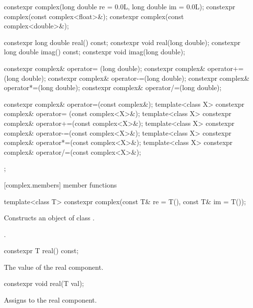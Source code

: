 \begin{codeblock}
{{    constexpr complex(long double re = 0.0L, long double im = 0.0L);
    constexpr complex(const complex<float>&);
    constexpr complex(const complex<double>&);

    constexpr long double real() const;
    constexpr void real(long double);
    constexpr long double imag() const;
    constexpr void imag(long double);

    constexpr complex& operator= (long double);
    constexpr complex& operator+=(long double);
    constexpr complex& operator-=(long double);
    constexpr complex& operator*=(long double);
    constexpr complex& operator/=(long double);

    constexpr complex& operator=(const complex&);
    template<class X> constexpr complex& operator= (const complex<X>&);
    template<class X> constexpr complex& operator+=(const complex<X>&);
    template<class X> constexpr complex& operator-=(const complex<X>&);
    template<class X> constexpr complex& operator*=(const complex<X>&);
    template<class X> constexpr complex& operator/=(const complex<X>&);
  };
}
\end{codeblock}

[complex.members]{ member functions}

%
\begin{itemdecl}
template<class T> constexpr complex(const T& re = T(), const T& im = T());
\end{itemdecl}

\begin{itemdescr}
\pnum
\effects
Constructs an object of class
.

\pnum
\postconditions
{}.
\end{itemdescr}

%
\begin{itemdecl}
constexpr T real() const;
\end{itemdecl}

\begin{itemdescr}
\pnum
\returns The value of the real component.
\end{itemdescr}

%
\begin{itemdecl}
constexpr void real(T val);
\end{itemdecl}

\begin{itemdescr}
\pnum
\effects Assigns  to the real component.
\end{itemdescr}

